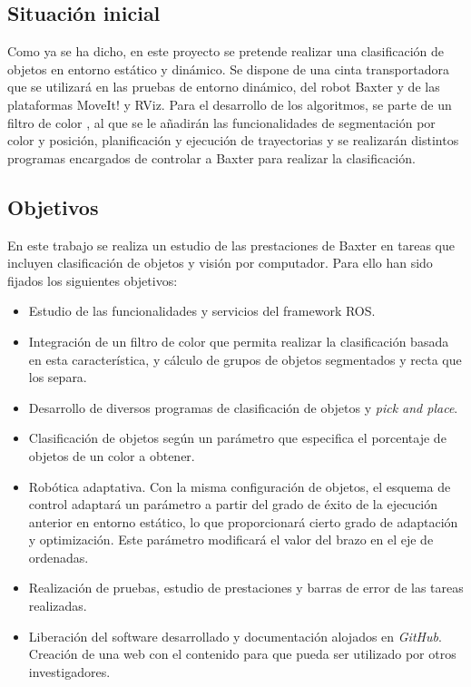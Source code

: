 \subsection{Situación inicial}
\noindent Como ya se ha dicho, en este proyecto se pretende realizar una clasificación de objetos en entorno estático y dinámico. Se dispone de una cinta transportadora que se utilizará en las pruebas de entorno dinámico, del robot Baxter y de las plataformas MoveIt! y RViz. Para el desarrollo de los algoritmos, se parte de un filtro de color \cite{maik}, al que se le añadirán las funcionalidades de segmentación por color y posición, planificación y ejecución de trayectorias y se realizarán distintos programas encargados de controlar a Baxter para realizar la clasificación. \\


\subsection{Objetivos}
\label{objetivos}
\noindent En este trabajo se realiza un estudio de las prestaciones de Baxter en tareas que incluyen clasificación de objetos y visión por computador. Para ello han sido fijados los siguientes objetivos:
\begin{itemize}
	\item Estudio de las funcionalidades y servicios del framework ROS.
	\item Integración de un filtro de color que permita realizar la clasificación basada en esta característica, y cálculo de grupos de objetos segmentados y recta que los separa.
	\item Desarrollo de diversos programas de clasificación de objetos y \textit{pick and place}.
	\item Clasificación de objetos según un parámetro que especifica el porcentaje de objetos de un color a obtener.
	\item Robótica adaptativa. Con la misma configuración de objetos, el esquema de control adaptará un parámetro a partir del grado de éxito de la ejecución anterior en entorno estático, lo que proporcionará cierto grado de adaptación y optimización. Este parámetro modificará el valor del brazo en el eje de ordenadas.

	\item Realización de pruebas, estudio de prestaciones y barras de error de las tareas realizadas.
	\item Liberación del software desarrollado y documentación alojados en \textit{GitHub}. Creación de una web con el contenido para que pueda ser utilizado por otros investigadores.
\end{itemize}

